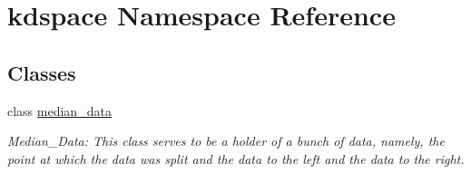 \hypertarget{namespacekdspace}{\section{kdspace Namespace Reference}
\label{namespacekdspace}
}
\subsection*{Classes}
\begin{DoxyCompactItemize}
\item 
class \hyperlink{classkdspace_1_1median__data}{median\-\_\-data}
\begin{DoxyCompactList}\small\item\em Median\-\_\-\-Data\-: This class serves to be a holder of a bunch of data, namely, the point at which the data was split and the data to the left and the data to the right. \end{DoxyCompactList}\end{DoxyCompactItemize}
